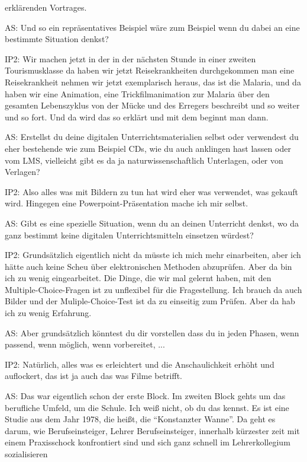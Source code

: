 \documentclass[fontsize=11pt,paper=a4]{scrbook}
\begin{document}
{\begin{itemize*}
erklärenden Vortrages.
\item[AS:] Und so ein repräsentatives
Beispiel wäre zum Beispiel wenn du dabei
 an eine bestimmte Situation denkst?
 \item[IP2:]   Wir machen jetzt in der in der nächsten
Stunde in einer zweiten Tourismusklasse
da haben wir jetzt Reisekrankheiten
durchgekommen man eine Reisekrankheit
nehmen wir jetzt exemplarisch heraus, das ist die Malaria, und da haben wir eine Animation, eine Trickfilmanimation
zur Malaria über den gesamten
Lebenszyklus von der Mücke und des Erregers beschreibt und so weiter und so fort. Und da wird das so erklärt und mit dem beginnt man dann.
\item[AS:]  Erstellst du
deine digitalen Unterrichtsmaterialien selbst oder verwendest du eher
bestehende wie zum Beispiel CDs, wie du auch
anklingen hast lassen oder vom LMS, vielleicht
gibt es da ja naturwissenschaftlich Unterlagen, oder von Verlagen?
\item[IP2:] Also alles was mit Bildern zu tun hat wird eher was verwendet, was gekauft wird. Hingegen eine Powerpoint-Präsentation mache ich mir selbst. 
\item[AS:] Gibt es eine spezielle Situation, wenn du an deinen Unterricht denkst, wo da ganz bestimmt keine digitalen Unterrichtsmitteln einsetzen würdest?
\item[IP2:] Grundsätzlich eigentlich nicht da
müsste ich mich mehr einarbeiten, aber ich hätte auch keine Scheu über elektronischen Methoden abzuprüfen. Aber da bin ich zu wenig eingearbeitet. Die Dinge, die wir mal gelernt haben, mit den Multiple-Choice-Fragen ist zu unflexibel für die Fragestellung. Ich brauch da auch Bilder und der Muliple-Choice-Test ist da zu einseitig zum Prüfen. Aber da hab ich zu wenig Erfahrung.
\item[AS:] Aber grundsätzlich könntest du dir
vorstellen dass du in jeden Phasen, wenn passend, wenn möglich, wenn vorbereitet, ...
\item[IP2:] Natürlich, alles was es erleichtert und die Anschaulichkeit erhöht und auflockert, das ist ja auch das was Filme betrifft.
\item[AS:] Das war eigentlich schon der erste Block. Im zweiten Block gehts um das berufliche Umfeld, um die Schule. Ich weiß nicht, ob du das kennst. Es ist eine Studie aus dem Jahr 1978, die heißt, die "`Konstanzter Wanne"'. Da geht es darum, wie  Berufseinsteiger, 
Lehrer Berufseinsteiger, innerhalb
kürzester zeit mit einem Praxisschock
konfrontiert sind und sich ganz schnell
im Lehrerkollegium sozialisieren

\end{itemize*}}
\end{document}
